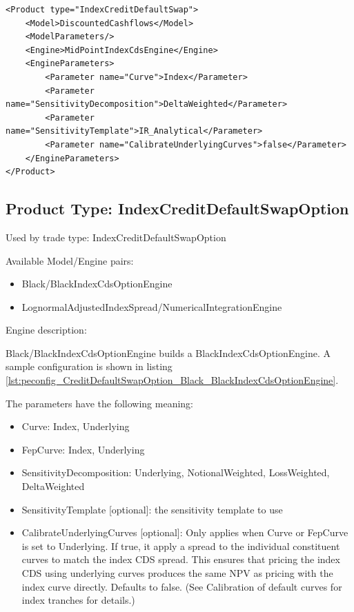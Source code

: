 \begin{longlisting}
\begin{verbatim}
<Product type="IndexCreditDefaultSwap">
    <Model>DiscountedCashflows</Model>
    <ModelParameters/>
    <Engine>MidPointIndexCdsEngine</Engine>
    <EngineParameters>
        <Parameter name="Curve">Index</Parameter>
        <Parameter name="SensitivityDecomposition">DeltaWeighted</Parameter>
        <Parameter name="SensitivityTemplate">IR_Analytical</Parameter>
        <Parameter name="CalibrateUnderlyingCurves">false</Parameter>
    </EngineParameters>
</Product>
\end{verbatim}
\caption{Configuration for Product CreditDefaultSwap, Model DiscountedCashflows, Engine MidPointIndexCdsEngine}
\label{lst:peconfig_CreditDefaultSwap_DiscountedCashflows_MidPointIndexCdsEngine}
\end{longlisting}

\subsection{Product Type: IndexCreditDefaultSwapOption}

Used by trade type: IndexCreditDefaultSwapOption

Available Model/Engine pairs:

\begin{itemize}
\item Black/BlackIndexCdsOptionEngine
\item LognormalAdjustedIndexSpread/NumericalIntegrationEngine
\end{itemize}

Engine description:

Black/BlackIndexCdsOptionEngine builds a BlackIndexCdsOptionEngine. A sample configuration is shown in listing
\ref{lst:peconfig_CreditDefaultSwapOption_Black_BlackIndexCdsOptionEngine}.

The parameters have the following meaning:

\begin{itemize}
\item Curve: Index, Underlying
\item FepCurve: Index, Underlying
\item SensitivityDecomposition: Underlying, NotionalWeighted, LossWeighted, DeltaWeighted
\item SensitivityTemplate [optional]: the sensitivity template to use
\item CalibrateUnderlyingCurves [optional]: Only applies when Curve or FepCurve is set to Underlying.
If true, it apply a spread to the individual constituent curves to match the index CDS spread.
This ensures that pricing the index CDS using underlying curves produces the same NPV as pricing with the index curve directly. Defaults to false.
(See Calibration of default curves for index tranches for details.)
\end{itemize}

